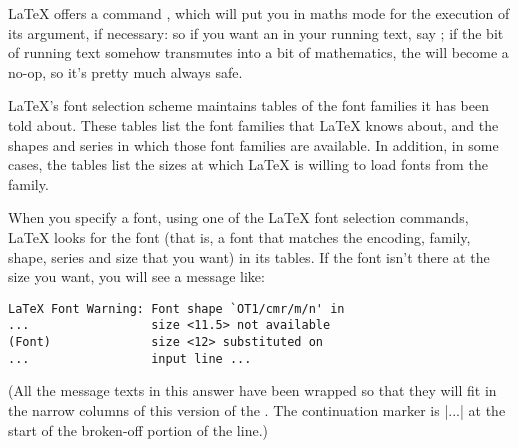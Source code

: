 {\LaTeX{} offers a command , which will put you in maths
mode for the execution of its argument, if necessary: so if you want
an  in your running text, say
; if the bit of running text somehow
transmutes into a bit of mathematics, the  will become
a no-op, so it's pretty much always safe.


\LaTeX{}'s font selection scheme maintains tables of the font families
it has been told about.  These tables list the font families that
\LaTeX{} knows about, and the shapes and series in which those font
families are available.  In addition, in some cases, the tables list
the sizes at which \LaTeX{} is willing to load fonts from the family.

When you specify a font, using one of the \LaTeX{} font selection
commands, \LaTeX{} looks for the font (that is, a font that matches
the encoding, family, shape, series and size that you want) in its
tables.  If the font isn't there at the size you want, you will see a
message like:
\htmlignore
\begin{dviversion}
\begin{verbatim}
LaTeX Font Warning: Font shape `OT1/cmr/m/n' in
...                 size <11.5> not available
(Font)              size <12> substituted on
...                 input line ...
\end{verbatim}
(All the message texts in this answer have been wrapped so that they
will fit in the narrow columns of this version of the .  The
continuation marker is |...| at the start of the broken-off portion of
the line.)


\end{dviversion}}
